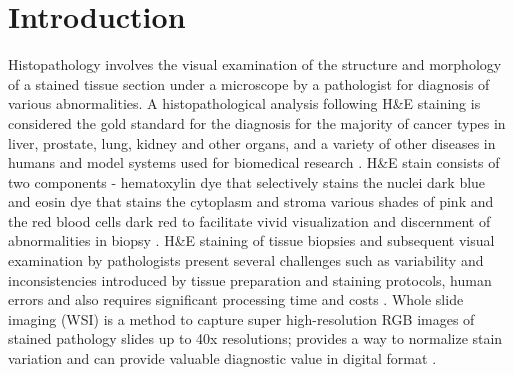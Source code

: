 \documentclass[10pt, conference, compsocconf]{IEEEtran}
\begin{document}
\section{Introduction}
Histopathology involves the visual examination of the structure and morphology of a stained tissue section under a microscope by a pathologist for diagnosis of various abnormalities. A histopathological analysis following H\&E staining is considered the gold standard for the diagnosis for the majority of cancer types in liver, prostate, lung, kidney and other organs, and a variety of other diseases in humans and model systems used for biomedical research \cite{rubins_pathology}. H\&E stain consists of two components - hematoxylin dye that selectively stains the nuclei dark blue and eosin dye that stains the cytoplasm and stroma various shades of pink and the red blood cells dark red to facilitate vivid visualization and discernment of abnormalities in biopsy \cite{staining_protocol}. H\&E staining of tissue biopsies and subsequent visual examination by pathologists present several challenges such as variability and inconsistencies introduced by tissue preparation and staining protocols, human errors and also requires significant processing time and costs \cite{sources_of_variability}.  Whole slide imaging (WSI) is a method to capture super high-resolution RGB images of stained pathology slides up to 40x resolutions; provides a way to normalize stain variation and can provide valuable diagnostic value in digital format \cite{farahani2015whole,cho2017neural,zanjani2018stain,bug2017context,macenko2009method,mukhopadhyay2018whole}.
\end{document}
